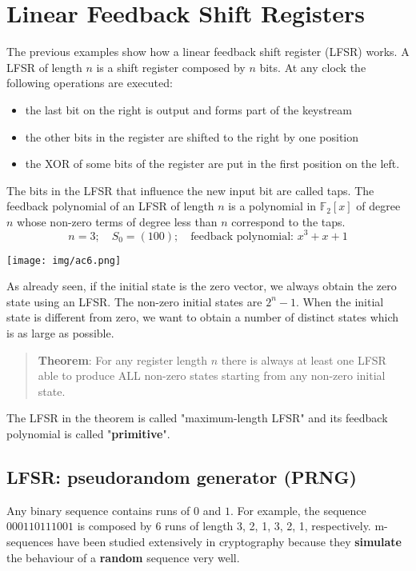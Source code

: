 \documentclass[a4paper, 10pt, titlepage]{article}
\begin{document}
\section{Linear Feedback Shift Registers}
The previous examples show how a linear feedback shift register (LFSR) works.
A LFSR of length $n$ is a shift register
composed by $n$ bits.
At any clock the following operations are executed:
\begin{itemize}
\item the last bit on the right is output and forms part of the keystream
\item the other bits in the register are shifted to the right by one position
\item the XOR of some bits of the register are put in the first position on
the left.
\end{itemize}
The bits in the LFSR that influence the new input bit are called taps. The feedback polynomial of an LFSR of length $n$ is a polynomial in $\mathbb{F}_2[x]$ of degree $n$ whose non-zero terms of degree less than $n$ correspond to the taps.
$$n=3; \quad S_0 = (100); \quad \text{feedback polynomial: }x^3 + x + 1$$
\begin{center}
\texttt{[image: img/ac6.png]}
\end{center}
As already seen, if the initial state is the zero vector, we always obtain the zero state using an LFSR.
The non-zero initial states are $2^n - 1$. When the initial state is different from zero, we want to obtain a number of distinct states which is as large as possible.
\begin{quote}
\textbf{Theorem}: For any register length $n$ there is always at least one LFSR able to produce ALL non-zero states starting from any non-zero initial state.
\end{quote}
The LFSR in the theorem is called "maximum-length LFSR" and its  feedback polynomial is called "\textbf{primitive}". 
\subsection{LFSR: pseudorandom generator (PRNG)}
Any binary sequence contains runs of $0$ and $1$. For example, the sequence $000110111001$ is composed by 6 runs of length 3, 2, 1, 3, 2, 1, respectively. m-sequences have been studied extensively in cryptography because they \textbf{simulate} the behaviour of a \textbf{random} sequence very well.
\end{document}
